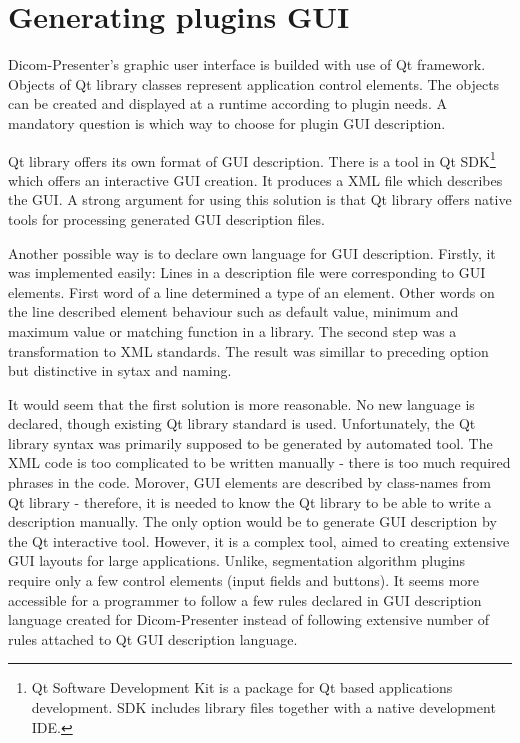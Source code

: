 \section{Generating plugins GUI}

Dicom-Presenter's graphic user interface is builded with use of Qt framework. Objects of Qt library classes represent application control elements. The objects can be created and displayed at a runtime according to plugin needs. A mandatory question is which way to choose for plugin GUI description.

Qt library offers its own format of GUI description. There is a tool in Qt SDK\footnote{Qt Software Development Kit is a package for Qt based applications development. SDK includes library files together with a native development IDE.} which offers an interactive GUI creation. It produces a XML file which describes the GUI. A strong argument for using this solution is that Qt library offers native tools for processing generated GUI description files.

Another possible way is to declare own language for GUI description. Firstly, it was implemented easily: Lines in a description file were corresponding to GUI elements. First word of a line determined a type of an element. Other words on the line described element behaviour such as default value, minimum and maximum value or matching function in a library. The second step was a transformation to XML standards. The result was simillar to preceding option but distinctive in sytax and naming. 

It would seem that the first solution is more reasonable. No new language is declared, though existing Qt library standard is used. Unfortunately, the Qt library syntax was primarily supposed to be generated by automated tool. The XML code is too complicated to be written manually - there is too much required phrases in the code. Morover, GUI elements are described by class-names from Qt library - therefore, it is needed to know the Qt library to be able to write a description manually. The only option would be to generate GUI description by the Qt interactive tool. However, it is a complex tool, aimed to creating extensive GUI layouts for large applications. Unlike, segmentation algorithm plugins require only a few control elements (input fields and buttons). It seems more accessible for a programmer to follow a few rules declared in GUI description language created for Dicom-Presenter instead of following extensive number of rules attached to Qt GUI description language.

